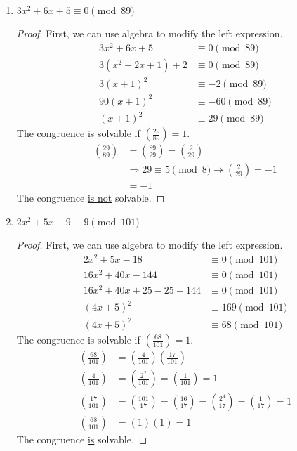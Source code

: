 \documentclass[11pt]{article}
\theoremstyle{definition}
\newcommand{\legendre}[2]{\ensuremath{\left( \frac{#1}{#2} \right) }}
\begin{document}
\begin{enumerate}
\begin{enumerate}
        \item $3x^2+6x + 5 \equiv 0 \pmod{89}$
        \begin{proof} First, we can use algebra to modify the left expression.
            \begin{align*}
                3x^2+6x+5 &\equiv 0 \pmod{89} \\ 
                3(x^2+2x+1) + 2 &\equiv 0 \pmod{89} \\ 
                3(x+1)^2 &\equiv -2 \pmod{89} \\ 
                90(x+1)^2 &\equiv -60 \pmod{89} \\
                (x+1)^2 &\equiv 29 \pmod{89}
            \end{align*}
            The congruence is solvable if $\legendre{29}{89} = 1$.
            \begin{align*}
                \legendre{29}{89} &= \legendre{89}{29} = \legendre{2}{29} \\
                &\Longrightarrow 29\equiv 5\pmod{8} \rightarrow \legendre{2}{29} = -1 \\
                &= -1
            \end{align*}
            The congruence \underline{is not} solvable. 
        \end{proof}

        \item $2x^2 + 5x - 9 \equiv 9 \pmod{101}$
        \begin{proof} First, we can use algebra to modify the left expression.
            \begin{align*}
                2x^2+5x-18 &\equiv 0 \pmod{101} \\
                16x^2 + 40x - 144 &\equiv 0\pmod{101} \\
                16x^2 + 40x + 25 - 25 - 144 &\equiv 0\pmod{101} \\
                (4x+5)^2 &\equiv 169\pmod{101} \\ 
                (4x+5)^2 &\equiv 68\pmod{101}
            \end{align*} 
            The congruence is solvable if $\legendre{68}{101} = 1$.
            \begin{align*}
                \legendre{68}{101} &= \legendre{4}{101}\legendre{17}{101} \\
                \legendre{4}{101} &= \legendre{2^2}{101} = \legendre{1}{101} = 1\\
                \legendre{17}{101} &= \legendre{101}{17} = \legendre{16}{17}
                = \legendre{2^4}{17} = \legendre{1}{17} = 1 \\
                \legendre{68}{101} &= (1)(1) = 1
            \end{align*}
            The congruence \underline{is} solvable.
        \end{proof}


\end{enumerate}
\end{enumerate}
\end{document}
